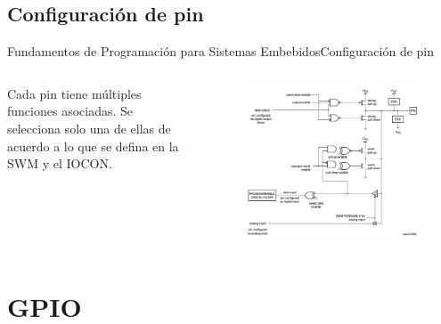 \documentclass[aspectratio=169, xcolor=dvipsnames]{beamer}
\begin{document}
\subsection{Configuración de pin}
\begin{frame}{Fundamentos de Programación para Sistemas Embebidos}{Configuración de pin}
\begin{columns}
\begin{column}{0.3\textwidth}
Cada pin tiene múltiples funciones asociadas. Se selecciona solo una de ellas de acuerdo a lo que se defina en la SWM y el IOCON.
\end{column}
\begin{column}{0.7\textwidth}
\begin{figure}
\centering
\includegraphics[width=0.75\linewidth]{resources/images/gpio_configuration.png}
\end{figure}    
\end{column}
\end{columns}
\end{frame}

\section{GPIO}
\end{document}
